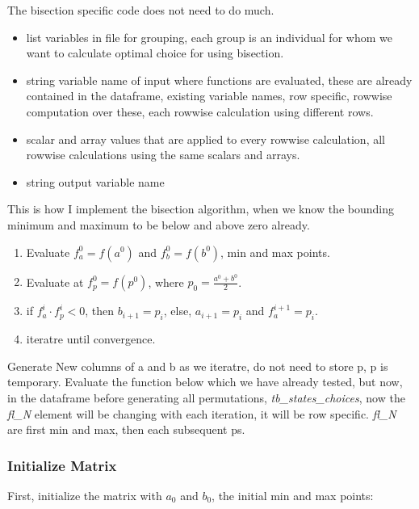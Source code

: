 \documentclass[
]{book}
\providecommand{\tightlist}{%
  \setlength{\itemsep}{0pt}\setlength{\parskip}{0pt}}
\begin{document}
The bisection specific code does not need to do much.

\begin{itemize}
\tightlist
\item
  list variables in file for grouping, each group is an individual for whom we want to calculate optimal choice for using bisection.
\item
  string variable name of input where functions are evaluated, these are already contained in the dataframe, existing variable names, row specific, rowwise computation over these, each rowwise calculation using different rows.
\item
  scalar and array values that are applied to every rowwise calculation, all rowwise calculations using the same scalars and arrays.
\item
  string output variable name
\end{itemize}

This is how I implement the bisection algorithm, when we know the bounding minimum and maximum to be below and above zero already.

\begin{enumerate}
\def\labelenumi{\arabic{enumi}.}
\tightlist
\item
  Evaluate \(f^0_a = f(a^0)\) and \(f^0_b = f(b^0)\), min and max points.
\item
  Evaluate at \(f^0_p = f(p^0)\), where \(p_0 = \frac{a^0+b^0}{2}\).
\item
  if \(f^i_a \cdot f^i_p < 0\), then \(b_{i+1} = p_i\), else, \(a_{i+1} = p_i\) and \(f^{i+1}_a = p_i\).
\item
  iteratre until convergence.
\end{enumerate}

Generate New columns of a and b as we iteratre, do not need to store p, p is temporary. Evaluate the function below which we have already tested, but now, in the dataframe before generating all permutations, \emph{tb\_states\_choices}, now the \emph{fl\_N} element will be changing with each iteration, it will be row specific. \emph{fl\_N} are first min and max, then each subsequent ps.

\hypertarget{initialize-matrix}{%
\subsubsection{Initialize Matrix}\label{initialize-matrix}}

First, initialize the matrix with \(a_0\) and \(b_0\), the initial min and max points:
\end{document}
